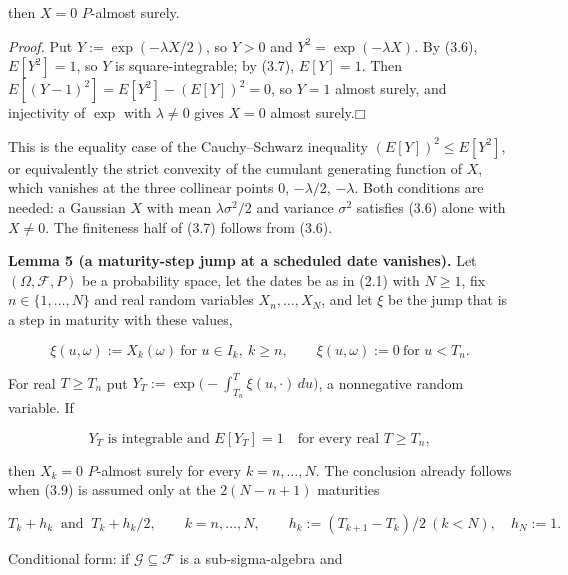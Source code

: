 \documentclass[11pt]{article}
\providecommand{\square}{\mdlgwhtsquare}
\begin{document}
then \(X = 0\) \(P\)-almost surely.

\emph{Proof.} Put \(Y := \exp(-\lambda X / 2)\), so \(Y > 0\) and \(Y^2 = \exp(-\lambda X)\). By (3.6), \(E[Y^2] = 1\), so \(Y\) is square-integrable; by (3.7), \(E[Y] = 1\). Then \(E[(Y - 1)^2] = E[Y^2] - (E[Y])^2 = 0\), so \(Y = 1\) almost surely, and injectivity of \(\exp\) with \(\lambda \ne 0\) gives \(X = 0\) almost surely.\hfill$\square$

This is the equality case of the Cauchy--Schwarz inequality \((E[Y])^2 \le E[Y^2]\), or equivalently the strict convexity of the cumulant generating function of \(X\), which vanishes at the three collinear points \(0\), \(-\lambda/2\), \(-\lambda\). Both conditions are needed: a Gaussian \(X\) with mean \(\lambda \sigma^2 / 2\) and variance \(\sigma^2\) satisfies (3.6) alone with \(X \ne 0\). The finiteness half of (3.7) follows from (3.6).

\label{res:Lemma-5}
\textbf{Lemma 5 (a maturity-step jump at a scheduled date vanishes).} Let \((\Omega, \mathcal F, P)\) be a probability space, let the dates be as in (2.1) with \(N \ge 1\), fix \(n \in \{1, \dots, N\}\) and real random variables \(X_n, \dots, X_N\), and let \(\xi\) be the jump that is a step in maturity with these values,

\begin{equation*}
\xi(u, \omega) := X_k(\omega) \ \text{for } u \in I_k,\ k \ge n, \qquad \xi(u, \omega) := 0 \ \text{for } u < T_n. \tag{3.8}\label{eq:3.8}
\end{equation*}

For real \(T \ge T_n\) put \(Y_T := \exp\bigl(-\int_{T_n}^T \xi(u, \cdot)\,du\bigr)\), a nonnegative random variable. If

\begin{equation*}
Y_T \text{ is integrable and } E[Y_T] = 1 \quad \text{for every real } T \ge T_n, \tag{3.9}\label{eq:3.9}
\end{equation*}

then \(X_k = 0\) \(P\)-almost surely for every \(k = n, \dots, N\). The conclusion already follows when (3.9) is assumed only at the \(2(N - n + 1)\) maturities

\begin{equation*}
T_k + h_k \ \text{ and } \ T_k + h_k / 2, \qquad k = n, \dots, N, \qquad h_k := (T_{k+1} - T_k)/2 \ (k < N), \quad h_N := 1. \tag{3.10}\label{eq:3.10}
\end{equation*}

Conditional form: if \(\mathcal G \subseteq \mathcal F\) is a sub-sigma-algebra and
\end{document}
